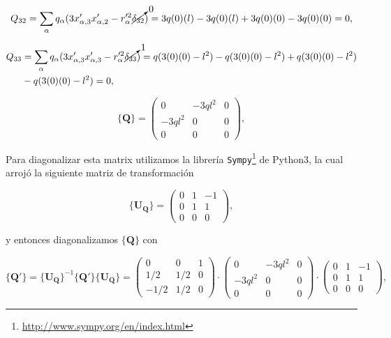 \documentclass[a4paper,11pt]{article}
\numberwithin{equation}{section}
\begin{document}
\begin{equation*}
 Q_{32} = \sum_\alpha q_\alpha(3x'_{\alpha,3}x'_{\alpha,2} - 
 r'^2_\alpha\cancelto{0}{\delta_{32}}) = 3q(0)(l) - 3q(0)(l) 
 + 3q(0)(0) - 3q(0)(0) = 0,
\end{equation*}

\begin{align*}
 Q_{33} &= \sum_\alpha q_\alpha(3x'_{\alpha,3}x'_{\alpha,3} -
 r'^2_\alpha\cancelto{1}{\delta_{33}}) 
 = q(3(0)(0) - l^2) - q(3(0)(0) - l^2) + q(3(0)(0) - l^2) \\ 
 &- q(3(0)(0) - l^2) = 0,
\end{align*}

\begin{equation}
 \{ \mathbf{Q} \} = \begin{pmatrix}
                     0 & -3ql^2 & 0 \\
                     -3ql^2 & 0 & 0 \\
                     0 & 0 & 0
                    \end{pmatrix},
\end{equation}

Para diagonalizar esta matrix utilizamos la librería 
\texttt{Sympy}\footnote{\href{http://www.sympy.org/en/index.html}{http://www.sympy.org/en/index.html}} 
de Python3, la cual arrojó la siguiente matriz de transformación 

\begin{equation}
 \{ \mathbf{U_Q} \} = \begin{pmatrix}
                     0 & 1 & -1 \\
                     0 & 1 & 1 \\
                     0 & 0 & 0
                    \end{pmatrix},
\end{equation}

y entonces diagonalizamos $\{ \mathbf{Q} \}$ con 

\begin{equation*}
 \{\mathbf{Q}'\} = \{\mathbf{U_Q}\}^{-1}\{\mathbf{Q}'\}\{\mathbf{U_Q}\}
		 = \begin{pmatrix}
                     0 & 0 & 1 \\
                     1/2 & 1/2 & 0 \\
                     -1/2 & 1/2 & 0
                    \end{pmatrix}
                    \cdot 
                    \begin{pmatrix}
                     0 & -3ql^2 & 0 \\
                     -3ql^2 & 0 & 0 \\
                     0 & 0 & 0
                    \end{pmatrix}
                    \cdot 
                    \begin{pmatrix}
                     0 & 1 & -1 \\
                     0 & 1 & 1 \\
                     0 & 0 & 0
                    \end{pmatrix},
\end{equation*}
\end{document}
